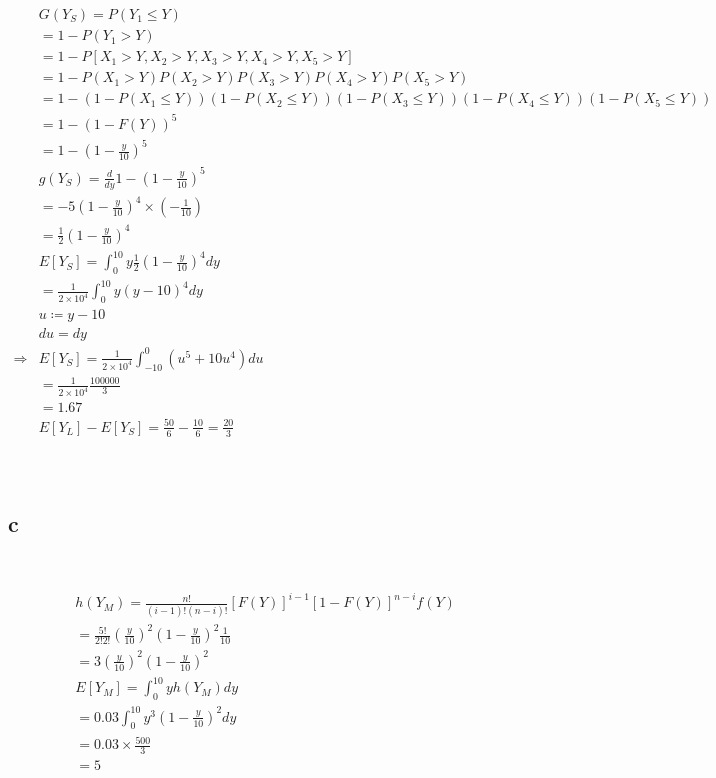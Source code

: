 \documentclass{article}
\begin{document}
\begin{align*}
    &G(Y_S)=P(Y_1\leqslant Y)\\
    &=1-P(Y_1>Y)\\
    &=1-P[X_1>Y,X_2>Y,X_3>Y,X_4>Y,X_5>Y]\\
    &=1-P(X_1>Y)P(X_2>Y)P(X_3>Y)P(X_4>Y)P(X_5>Y)\\
    &=1-(1-P(X_1\leqslant Y))(1-P(X_2\leqslant Y))(1-P(X_3\leqslant Y))(1-P(X_4\leqslant Y))(1-P(X_5\leqslant Y))\\
    &=1-(1-F(Y))^5\\
    &=1-(1-\frac{y}{10})^5\\
    &g(Y_S)=\frac{d}{dy}1-(1-\frac{y}{10})^5\\
    &=-5(1-\frac{y}{10})^4\times(-\frac{1}{10})\\
    &=\frac{1}{2}(1-\frac{y}{10})^4\\
    &E[Y_S]=\int_{0}^{10}y\frac{1}{2}(1-\frac{y}{10})^4dy\\
    &=\frac{1}{2\times10^4}\int_{0}^{10}y(y-10)^4dy\\
    &u\coloneqq y-10\\
    &du=dy\\
    \Rightarrow&E[Y_S]=\frac{1}{2\times10^4}\int_{-10}^{0}(u^5+10u^4)du\\
    &=\frac{1}{2\times10^4}\frac{100000}{3}\\
    &=1.67\\
    &E[Y_L]-E[Y_S]=\frac{50}{6}-\frac{10}{6}=\frac{20}{3}\\
\end{align*}

~

\subsection*{c}

~

\begin{align*}
    &h(Y_M)=\frac{n!}{(i-1)!(n-i)!}[F(Y)]^{i-1}[1-F(Y)]^{n-i}f(Y)\\
    &=\frac{5!}{2!2!}(\frac{y}{10})^2(1-\frac{y}{10})^2\frac{1}{10}\\
    &=3(\frac{y}{10})^2(1-\frac{y}{10})^2\\
    &E[Y_M]=\int_{0}^{10}yh(Y_M)dy\\
    &=0.03\int_{0}^{10}y^3(1-\frac{y}{10})^2dy\\
    &=0.03\times\frac{500}{3}\\
    &=5\\
\end{align*}
\end{document}
